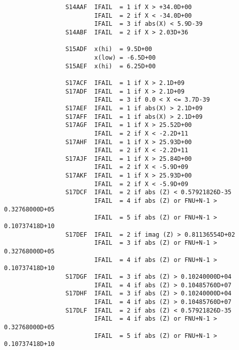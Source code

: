 \begin{small}
\begin{verbatim}
                 S14AAF  IFAIL  = 1 if X > +34.0D+00                            
                         IFAIL  = 2 if X < -34.0D+00                            
                         IFAIL  = 3 if abs(X) < 5.9D-39                         
                 S14ABF  IFAIL  = 2 if X > 2.03D+36                             
                                                                                
                 S15ADF  x(hi)  = 9.5D+00                                       
                         x(low) = -6.5D+00                                      
                 S15AEF  x(hi)  = 6.25D+00                                      
                                                                                
                 S17ACF  IFAIL  = 1 if X > 2.1D+09                              
                 S17ADF  IFAIL  = 1 if X > 2.1D+09                              
                         IFAIL  = 3 if 0.0 < X <= 3.7D-39                       
                 S17AEF  IFAIL  = 1 if abs(X) > 2.1D+09                         
                 S17AFF  IFAIL  = 1 if abs(X) > 2.1D+09                         
                 S17AGF  IFAIL  = 1 if X > 25.52D+00                            
                         IFAIL  = 2 if X < -2.2D+11                             
                 S17AHF  IFAIL  = 1 if X > 25.93D+00                            
                         IFAIL  = 2 if X < -2.2D+11                             
                 S17AJF  IFAIL  = 1 if X > 25.84D+00                            
                         IFAIL  = 2 if X < -5.9D+09                             
                 S17AKF  IFAIL  = 1 if X > 25.93D+00                            
                         IFAIL  = 2 if X < -5.9D+09                             
                 S17DCF  IFAIL  = 2 if abs (Z) < 0.57921826D-35                 
                         IFAIL  = 4 if abs (Z) or FNU+N-1 > 0.32768000D+05      
                         IFAIL  = 5 if abs (Z) or FNU+N-1 > 0.10737418D+10      
                 S17DEF  IFAIL  = 2 if imag (Z) > 0.81136554D+02                
                         IFAIL  = 3 if abs (Z) or FNU+N-1 > 0.32768000D+05      
                         IFAIL  = 4 if abs (Z) or FNU+N-1 > 0.10737418D+10      
                 S17DGF  IFAIL  = 3 if abs (Z) > 0.10240000D+04                 
                         IFAIL  = 4 if abs (Z) > 0.10485760D+07                 
                 S17DHF  IFAIL  = 3 if abs (Z) > 0.10240000D+04                 
                         IFAIL  = 4 if abs (Z) > 0.10485760D+07                 
                 S17DLF  IFAIL  = 2 if abs (Z) < 0.57921826D-35                 
                         IFAIL  = 4 if abs (Z) or FNU+N-1 > 0.32768000D+05      
                         IFAIL  = 5 if abs (Z) or FNU+N-1 > 0.10737418D+10      
                                                                                

\end{verbatim}
\end{small}
